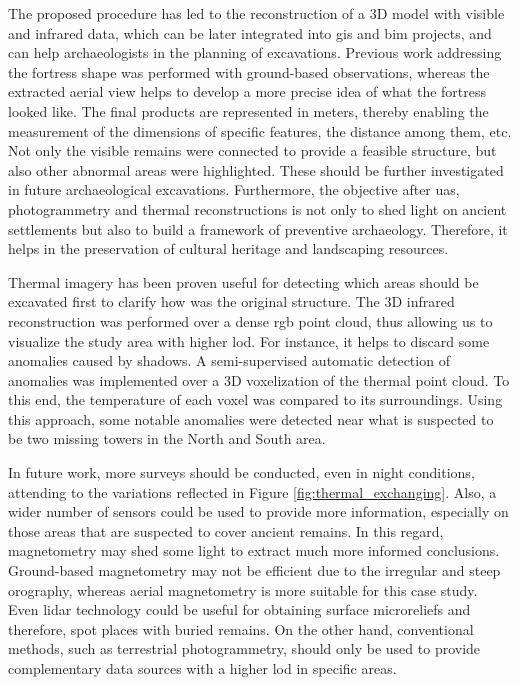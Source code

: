 The proposed procedure has led to the reconstruction of a 3D model with visible and infrared data, which can be later integrated into \acrshort{gis} and \acrshort{bim} projects, and can help archaeologists in the planning of excavations. Previous work addressing the fortress shape was performed with ground-based observations, whereas the extracted aerial view helps to develop a more precise idea of what the fortress looked like. The final products are represented in meters, thereby enabling the measurement of the dimensions of specific features, the distance among them, etc. Not only the visible remains were connected to provide a feasible structure, but also other abnormal areas were highlighted. These should be further investigated in future archaeological excavations. Furthermore, the objective after \acrshort{uas}, photogrammetry and thermal reconstructions is not only to shed light on ancient settlements but also to build a framework of preventive archaeology. Therefore, it helps in the preservation of cultural heritage and landscaping resources. 

Thermal imagery has been proven useful for detecting which areas should be excavated first to clarify how was the original structure. The 3D infrared reconstruction was performed over a dense \acrshort{rgb} point cloud, thus allowing us to visualize the study area with higher \acrshort{lod}. For instance, it helps to discard some anomalies caused by shadows. A semi-supervised automatic detection of anomalies was implemented over a 3D voxelization of the thermal point cloud. To this end, the temperature of each voxel was compared to its surroundings. Using this approach, some notable anomalies were detected near what is suspected to be two missing towers in the North and South area.   

In future work, more surveys should be conducted, even in night conditions, attending to the variations reflected in Figure \ref{fig:thermal_exchanging}. Also, a wider number of sensors could be used to provide more information, especially on those areas that are suspected to cover ancient remains. In this regard, magnetometry may shed some light to extract much more informed conclusions. Ground-based magnetometry may not be efficient due to the irregular and steep orography, whereas aerial magnetometry is more suitable for this case study. Even \acrshort{lidar} technology could be useful for obtaining surface microreliefs and therefore, spot places with buried remains. On the other hand, conventional methods, such as terrestrial photogrammetry, should only be used to provide complementary data sources with a higher \acrshort{lod} in specific areas.

